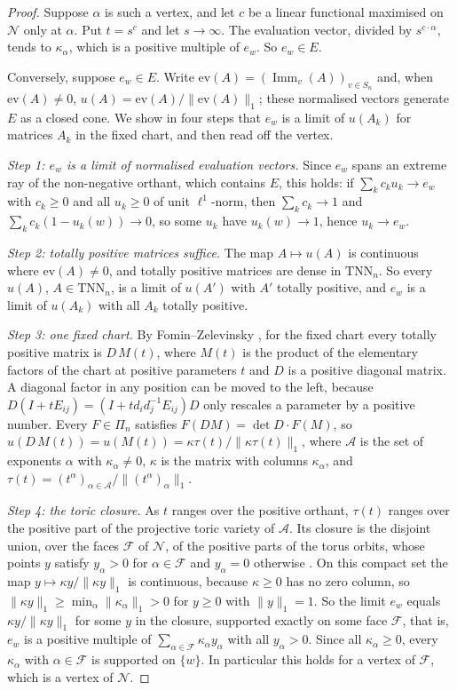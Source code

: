 \documentclass[11pt]{amsart}
\theoremstyle{definition}
\theoremstyle{remark}
\newcommand{\Imm}{\operatorname{Imm}}
\newcommand{\TNN}{\mathrm{TNN}}
\begin{document}
\begin{proof}
Suppose $\alpha$ is such a vertex, and let $c$ be a linear functional maximised on $\mathcal N$ only at $\alpha$. Put $t=s^c$ and let $s\to\infty$. The evaluation vector, divided by $s^{c\cdot\alpha}$, tends to $\kappa_\alpha$, which is a positive multiple of $e_w$. So $e_w\in E$.

Conversely, suppose $e_w\in E$. Write $\mathrm{ev}(A)=(\Imm_v(A))_{v\in S_n}$ and, when $\mathrm{ev}(A)\ne0$, $u(A)=\mathrm{ev}(A)/\|\mathrm{ev}(A)\|_1$; these normalised vectors generate $E$ as a closed cone. We show in four steps that $e_w$ is a limit of $u(A_k)$ for matrices $A_k$ in the fixed chart, and then read off the vertex.

\emph{Step 1: $e_w$ is a limit of normalised evaluation vectors.} Since $e_w$ spans an extreme ray of the non-negative orthant, which contains $E$, this holds: if $\sum_kc_ku_k\to e_w$ with $c_k\ge0$ and all $u_k\ge0$ of unit $\ell^1$-norm, then $\sum_kc_k\to1$ and $\sum_kc_k(1-u_k(w))\to0$, so some $u_k$ have $u_k(w)\to1$, hence $u_k\to e_w$.

\emph{Step 2: totally positive matrices suffice.} The map $A\mapsto u(A)$ is continuous where $\mathrm{ev}(A)\ne0$, and totally positive matrices are dense in $\TNN_n$. So every $u(A)$, $A\in\TNN_n$, is a limit of $u(A')$ with $A'$ totally positive, and $e_w$ is a limit of $u(A_k)$ with all $A_k$ totally positive.

\emph{Step 3: one fixed chart.} By Fomin--Zelevinsky \cite{FZ}, for the fixed chart every totally positive matrix is $D\,M(t)$, where $M(t)$ is the product of the elementary factors of the chart at positive parameters $t$ and $D$ is a positive diagonal matrix. A diagonal factor in any position can be moved to the left, because $D(I+tE_{ij})=(I+td_id_j^{-1}E_{ij})D$ only rescales a parameter by a positive number. Every $F\in\Pi_n$ satisfies $F(DM)=\det D\cdot F(M)$, so $u(D\,M(t))=u(M(t))=\kappa\tau(t)/\|\kappa\tau(t)\|_1$, where $\mathcal A$ is the set of exponents $\alpha$ with $\kappa_\alpha\ne0$, $\kappa$ is the matrix with columns $\kappa_\alpha$, and $\tau(t)=(t^\alpha)_{\alpha\in\mathcal A}/\|(t^\alpha)_\alpha\|_1$.

\emph{Step 4: the toric closure.} As $t$ ranges over the positive orthant, $\tau(t)$ ranges over the positive part of the projective toric variety of $\mathcal A$. Its closure is the disjoint union, over the faces $\mathcal F$ of $\mathcal N$, of the positive parts of the torus orbits, whose points $y$ satisfy $y_\alpha>0$ for $\alpha\in\mathcal F$ and $y_\alpha=0$ otherwise \cite{Sot}. On this compact set the map $y\mapsto\kappa y/\|\kappa y\|_1$ is continuous, because $\kappa\ge0$ has no zero column, so $\|\kappa y\|_1\ge\min_\alpha\|\kappa_\alpha\|_1>0$ for $y\ge0$ with $\|y\|_1=1$. So the limit $e_w$ equals $\kappa y/\|\kappa y\|_1$ for some $y$ in the closure, supported exactly on some face $\mathcal F$, that is, $e_w$ is a positive multiple of $\sum_{\alpha\in\mathcal F}\kappa_\alpha y_\alpha$ with all $y_\alpha>0$. Since all $\kappa_\alpha\ge0$, every $\kappa_\alpha$ with $\alpha\in\mathcal F$ is supported on $\{w\}$. In particular this holds for a vertex of $\mathcal F$, which is a vertex of $\mathcal N$.
\end{proof}
\end{document}

